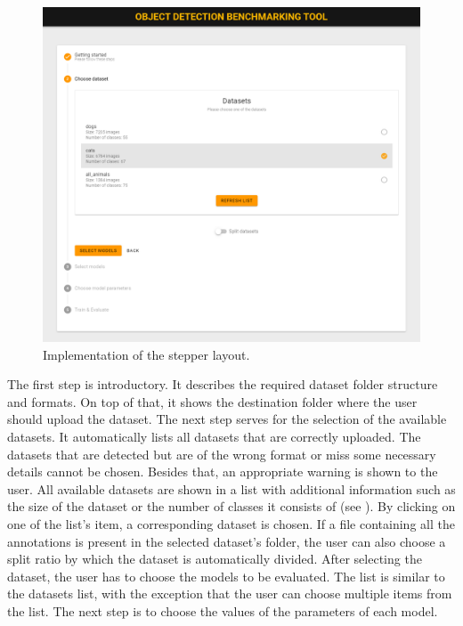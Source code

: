 \begin{figure}[h]
    \centering
    \includegraphics[width=0.85\linewidth]{Sources/Figures/datasets_selection.png}
    \caption{Implementation of the stepper layout.}
    \label{fig:datasets_selection}
\end{figure}

The first step is introductory. It describes the required dataset folder
structure and formats. On top of that, it shows the destination folder where the
user should upload the dataset. The next step serves for the selection of the
available datasets. It automatically lists all datasets that are correctly
uploaded. The datasets that are detected but are of the wrong format or miss
some necessary details cannot be chosen. Besides that, an appropriate warning
is shown to the user. All available datasets are shown in a list with additional
information such as the size of the dataset or the number of classes it consists
of (see ). By clicking on one of the list's
item, a corresponding dataset is chosen. If a file containing all the
annotations is present in the selected dataset's folder, the user can also
choose a split ratio by which the dataset is automatically divided. After
selecting the dataset, the user has to choose the models to be evaluated. The
list is similar to the datasets list, with the exception that the user can
choose multiple items from the list. The next step is to choose the values of
the parameters of each model.

